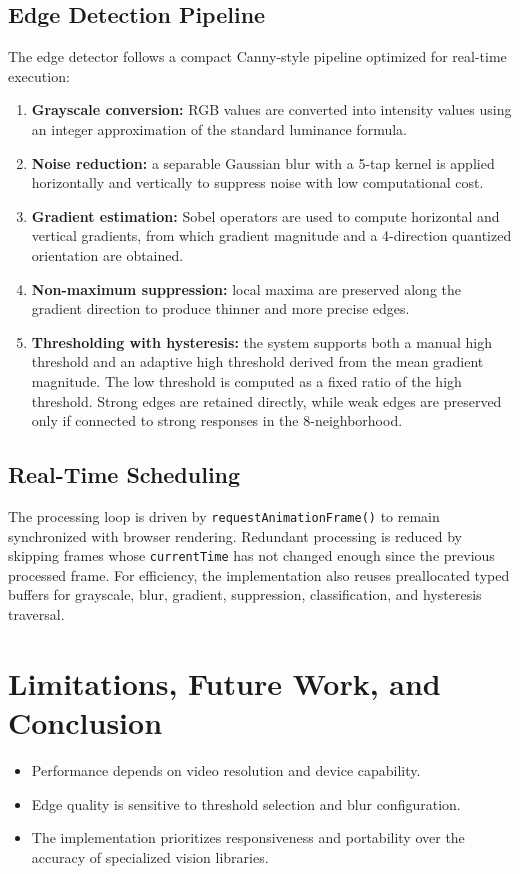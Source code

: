 \section{Edge Detection Pipeline}
The edge detector follows a compact Canny-style pipeline optimized for real-time execution:
\begin{enumerate}
  \item \textbf{Grayscale conversion:} RGB values are converted into intensity values using an integer approximation of the standard luminance formula.
  \item \textbf{Noise reduction:} a separable Gaussian blur with a 5-tap kernel is applied horizontally and vertically to suppress noise with low computational cost.
  \item \textbf{Gradient estimation:} Sobel operators are used to compute horizontal and vertical gradients, from which gradient magnitude and a 4-direction quantized orientation are obtained.
  \item \textbf{Non-maximum suppression:} local maxima are preserved along the gradient direction to produce thinner and more precise edges.
  \item \textbf{Thresholding with hysteresis:} the system supports both a manual high threshold and an adaptive high threshold derived from the mean gradient magnitude. The low threshold is computed as a fixed ratio of the high threshold. Strong edges are retained directly, while weak edges are preserved only if connected to strong responses in the 8-neighborhood.
\end{enumerate}

\section{Real-Time Scheduling}
The processing loop is driven by \texttt{requestAnimationFrame()} to remain synchronized with browser rendering. Redundant processing is reduced by skipping frames whose \texttt{currentTime} has not changed enough since the previous processed frame. For efficiency, the implementation also reuses preallocated typed buffers for grayscale, blur, gradient, suppression, classification, and hysteresis traversal.

\chapter{Limitations, Future Work, and Conclusion}
\begin{itemize}
  \item Performance depends on video resolution and device capability.
  \item Edge quality is sensitive to threshold selection and blur configuration.
  \item The implementation prioritizes responsiveness and portability over the accuracy of specialized vision libraries.
\end{itemize}

